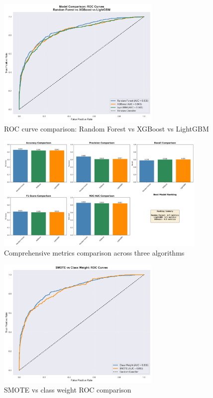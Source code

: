 \documentclass[12pt]{article}
\begin{document}
\begin{figure}[H]
\centering
\includegraphics[width=0.7\textwidth]{img/21_model_comparison_roc.png}
\caption{ROC curve comparison: Random Forest vs XGBoost vs LightGBM}
\label{fig:model_comparison}
\end{figure}

\begin{figure}[H]
\centering
\includegraphics[width=0.9\textwidth]{img/24_model_comparison_metrics.png}
\caption{Comprehensive metrics comparison across three algorithms}
\label{fig:metrics_comparison}
\end{figure}

\begin{figure}[H]
\centering
\includegraphics[width=0.7\textwidth]{img/25_smote_roc_comparison.png}
\caption{SMOTE vs class weight ROC comparison}
\label{fig:smote_roc}
\end{figure}
\end{document}
